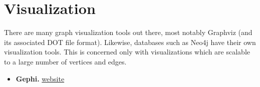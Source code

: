 \documentclass[11pt]{article}
\begin{document}
\section{Visualization}
There are many graph visualization tools out there, most notably Graphviz (and its associated DOT file format). Likewise, databases such as Neo4j have their own visualization tools. This is concerned only with visualizations which are scalable to a large number of vertices and edges.

\begin{itemize}
	\item \textbf{Gephi.} \href{https://gephi.org/}{website}
\end{itemize}





\end{document}

